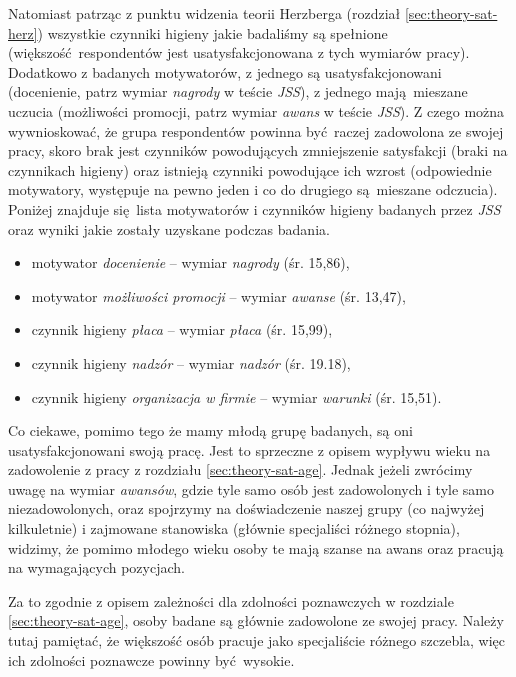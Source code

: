 Natomiast patrząc z punktu widzenia teorii Herzberga (rozdział \ref{sec:theory-sat-herz}) wszystkie czynniki higieny jakie badaliśmy są spełnione (większość respondentów jest usatysfakcjonowana z tych wymiarów pracy). Dodatkowo z badanych motywatorów, z jednego są usatysfakcjonowani (docenienie, patrz wymiar \textit{nagrody} w teście \emph{JSS}), z jednego mają mieszane uczucia (możliwości promocji, patrz wymiar \textit{awans} w teście \emph{JSS}). Z czego można wywnioskować, że
grupa respondentów powinna być raczej zadowolona ze swojej pracy, skoro brak jest czynników powodujących zmniejszenie satysfakcji (braki na czynnikach higieny) oraz istnieją czynniki powodujące ich wzrost (odpowiednie motywatory, występuje na pewno jeden i co do drugiego są mieszane odczucia). Poniżej znajduje się lista motywatorów i czynników higieny badanych przez \emph{JSS} oraz wyniki jakie zostały uzyskane podczas badania.

\begin{itemize}
  \item motywator \textit{docenienie} -- wymiar \textit{nagrody} (śr. 15,86),
  \item motywator \textit{możliwości promocji} -- wymiar \textit{awanse} (śr. 13,47),
  \item czynnik higieny \textit{płaca} -- wymiar \textit{płaca} (śr. 15,99),
  \item czynnik higieny \textit{nadzór} -- wymiar \textit{nadzór} (śr. 19.18),
  \item czynnik higieny \textit{organizacja w firmie} -- wymiar \textit{warunki} (śr. 15,51).
\end{itemize}

Co ciekawe, pomimo tego że mamy młodą grupę badanych, są oni usatysfakcjonowani swoją pracę. Jest to sprzeczne z opisem wypływu wieku na zadowolenie z pracy z rozdziału \ref{sec:theory-sat-age}. Jednak jeżeli zwrócimy uwagę na wymiar \textit{awansów}, gdzie tyle samo osób jest zadowolonych i tyle samo niezadowolonych, oraz spojrzymy na doświadczenie naszej grupy (co najwyżej kilkuletnie) i zajmowane stanowiska (głównie specjaliści różnego stopnia), widzimy, że pomimo młodego wieku
osoby te mają szanse na awans oraz pracują na wymagających pozycjach.

Za to zgodnie z opisem zależności dla zdolności poznawczych w rozdziale \ref{sec:theory-sat-age}, osoby badane są głównie zadowolone ze swojej pracy. Należy tutaj pamiętać, że większość osób pracuje jako specjaliście różnego szczebla, więc ich zdolności poznawcze powinny być wysokie.


